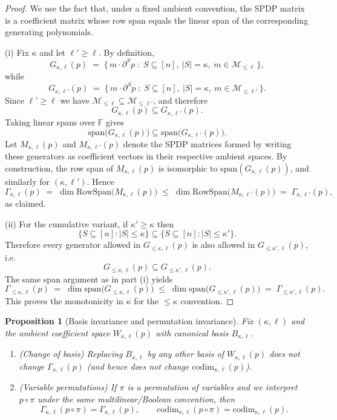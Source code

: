 \documentclass[12pt]{article}
\newtheorem{proposition}[theorem]{Proposition}
\theoremstyle{definition}
\theoremstyle{remark}
\begin{document}
\begin{proof}
We use the fact that, under a fixed ambient convention, the SPDP matrix is a
coefficient matrix whose row span equals the linear span of the corresponding
generating polynomials.

\smallskip
\noindent
(i) Fix $\kappa$ and let $\ell' \ge \ell$. By definition,
\[
  G_{\kappa,\ell}(p)
  \;=\;
  \{\, m\cdot \partial^{S}p \;:\; S\subseteq[n],\ |S|=\kappa,\ m\in \mathcal{M}_{\le \ell}\,\},
\]
while
\[
  G_{\kappa,\ell'}(p)
  \;=\;
  \{\, m\cdot \partial^{S}p \;:\; S\subseteq[n],\ |S|=\kappa,\ m\in \mathcal{M}_{\le \ell'}\,\}.
\]
Since $\ell'\ge \ell$ we have $\mathcal{M}_{\le \ell}\subseteq \mathcal{M}_{\le \ell'}$,
and therefore
\[
  G_{\kappa,\ell}(p)\subseteq G_{\kappa,\ell'}(p).
\]
Taking linear spans over $\mathbb{F}$ gives
\[
  \mathrm{span}\bigl(G_{\kappa,\ell}(p)\bigr)\subseteq \mathrm{span}\bigl(G_{\kappa,\ell'}(p)\bigr).
\]
Let $M_{\kappa,\ell}(p)$ and $M_{\kappa,\ell'}(p)$ denote the SPDP matrices formed by writing
these generators as coefficient vectors in their respective ambient spaces.
By construction, the row span of $M_{\kappa,\ell}(p)$ is isomorphic to
$\mathrm{span}(G_{\kappa,\ell}(p))$, and similarly for $(\kappa,\ell')$.
Hence
\[
  \Gamma_{\kappa,\ell}(p)
  \;=\;
  \dim \mathrm{RowSpan}\bigl(M_{\kappa,\ell}(p)\bigr)
  \;\le\;
  \dim \mathrm{RowSpan}\bigl(M_{\kappa,\ell'}(p)\bigr)
  \;=\;
  \Gamma_{\kappa,\ell'}(p),
\]
as claimed.

\smallskip
\noindent
(ii) For the cumulative variant, if $\kappa'\ge \kappa$ then
\[
  \{S\subseteq[n]:|S|\le \kappa\}\subseteq \{S\subseteq[n]:|S|\le \kappa'\}.
\]
Therefore every generator allowed in $G_{\le \kappa,\ell}(p)$ is also allowed in
$G_{\le \kappa',\ell}(p)$, i.e.
\[
  G_{\le \kappa,\ell}(p)\subseteq G_{\le \kappa',\ell}(p).
\]
The same span argument as in part (i) yields
\[
  \Gamma_{\le \kappa,\ell}(p)
  \;=\;
  \dim \mathrm{span}\bigl(G_{\le \kappa,\ell}(p)\bigr)
  \;\le\;
  \dim \mathrm{span}\bigl(G_{\le \kappa',\ell}(p)\bigr)
  \;=\;
  \Gamma_{\le \kappa',\ell}(p).
\]
This proves the monotonicity in $\kappa$ for the $\le \kappa$ convention.
\end{proof}

\begin{proposition}[Basis invariance and permutation invariance]
\label{prop:basis-and-perm-invariance}
Fix $(\kappa,\ell)$ and the ambient coefficient space $W_{\kappa,\ell}(p)$ with canonical
basis $B_{\kappa,\ell}$.
\begin{enumerate}
\item[(i)] (\emph{Change of basis}) Replacing $B_{\kappa,\ell}$ by any other basis of
$W_{\kappa,\ell}(p)$ does not change $\Gamma_{\kappa,\ell}(p)$ (and hence does not change
$\mathrm{codim}_{\kappa,\ell}(p)$).
\item[(ii)] (\emph{Variable permutations}) If $\pi$ is a permutation of variables and
we interpret $p\circ \pi$ under the same multilinear/Boolean convention, then
\[
\Gamma_{\kappa,\ell}(p\circ \pi)=\Gamma_{\kappa,\ell}(p),
\qquad
\mathrm{codim}_{\kappa,\ell}(p\circ \pi)=\mathrm{codim}_{\kappa,\ell}(p).
\]
\end{enumerate}
\end{proposition}
\end{document}
